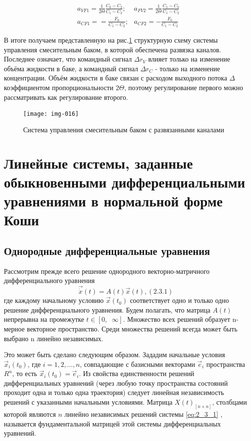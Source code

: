 \begin{align}
&a_{VF1}=\frac1{2\Theta }\frac{C_0-C_2}{C_1-C_2};&a_{FV2}=\frac
1{2\Theta }\frac{C_1-C_0}{C_1-C_2}\\\nonumber
&a_{CF1}==\frac{F_0}{C_1-C_2};&a_{CF2}=-\frac{F_0}{C_1-C_2}
\end{align}


		В итоге получаем представленную на рис.\ref{fig:buck_system} %
		структурную схему системы управления смесительным баком, в которой обеспечена
		развязка каналов. Последнее означает, что командный сигнал  $\mathit{\Delta r}_V$ влияет только на изменение объёма жидкости
		в баке, а командный сигнал  $\mathit{\Delta r}_C$ - только на изменение концентрации. Объём жидкости в баке связан с расходом
		выходного потока  $\mathit{\Delta  }$ коэффициентом пропорциональности  $2\Theta $, поэтому регулирование первого можно
		рассматривать как регулирование второго.

\begin{figure}[]
	\centering
	\texttt{[image: img-016]}
	\caption{Система управления смесительным баком
		с развязанными каналами}
	\label{fig:buck_system} 
\end{figure}
\section{Линейные системы, заданные обыкновенными   дифференциальными уравнениями в нормальной форме Коши}
\subsection{Однородные дифференциальные уравнения}
		Рассмотрим прежде всего решение однородного векторно-матричного дифференциального уравнения
	\begin{equation}\label{eq:2_3_1}
	\vec{\dot x}(t)=A(t)\vec x(t),  (2.3.1)
	\end{equation}
		где каждому начальному условию  $\vec x(t_0)$ соответствует одно и только одно решение дифференциального уравнения.
		Будем полагать, что матрица  $A(t)$ непрерывна на промежутке  $t\in [0,\;\;\infty ]$. Множество всех решений образует
		{n}-мерное векторное пространство. Среди множества решений всегда может быть выбрано {n}
		линейно независимых.



		Это может быть сделано следующим образом. Зададим начальные условия  $\vec x_i(t_0)$, где  $i=1,2,\ldots,n$,
		совпадающие с базисными векторами  $\vec e_i$ пространства  $R^n$, то есть  $\vec x_i(t_0)=\vec e_i$. Из свойства
		единственности решений дифференциальных уравнений (через любую точку пространства состояний проходит одна и только одна
		траектория) следует линейная независимость решений с указанными начальными условиями. Матрица  $X(t)_{\left[n\times
			n\right]}$, столбцами которой являются  $n$ линейно независимых решений системы \eqref{eq:2_3_1}%
		, называется фундаментальной
		матрицей этой системы дифференциальных уравнений.



